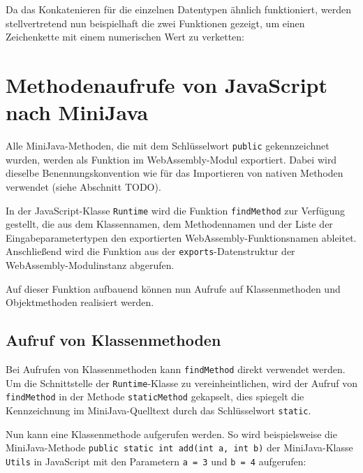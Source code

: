 Da das Konkatenieren für die einzelnen Datentypen ähnlich funktioniert, werden stellvertretend nun beispielhaft die zwei Funktionen gezeigt, um einen Zeichenkette mit einem numerischen Wert zu verketten:


\section{Methodenaufrufe von JavaScript nach MiniJava}

Alle MiniJava-Methoden, die mit dem Schlüsselwort \lstinline{public} gekennzeichnet wurden, werden als Funktion im WebAssembly-Modul exportiert. Dabei wird dieselbe Benennungskonvention wie für das Importieren von nativen Methoden verwendet (siehe Abschnitt TODO).

In der JavaScript-Klasse \lstinline{Runtime} wird die Funktion \lstinline{findMethod} zur Verfügung gestellt, die aus dem Klassennamen, dem Methodennamen und der Liste der Eingabeparametertypen den exportierten WebAssembly-Funktionsnamen ableitet. Anschließend wird die Funktion aus der \lstinline{exports}-Datenstruktur der WebAssembly-Modulinstanz abgerufen.



Auf dieser Funktion aufbauend können nun Aufrufe auf Klassenmethoden und Objektmethoden realisiert werden.

\subsection{Aufruf von Klassenmethoden}

Bei Aufrufen von Klassenmethoden kann \lstinline{findMethod} direkt verwendet werden. Um die Schnittstelle der \lstinline{Runtime}-Klasse zu vereinheintlichen, wird der Aufruf von \lstinline{findMethod} in der Methode \lstinline{staticMethod} gekapselt, dies spiegelt die Kennzeichnung im MiniJava-Quelltext durch das Schlüsselwort \lstinline{static}.



Nun kann eine Klassenmethode aufgerufen werden. So wird beispielsweise die Mini\-Java-Methode \lstinline{public static int add(int a, int b)} der MiniJava-Klasse \lstinline{Utils} in Java\-Script mit den Parametern \lstinline{a = 3} und \lstinline{b = 4} aufgerufen:



